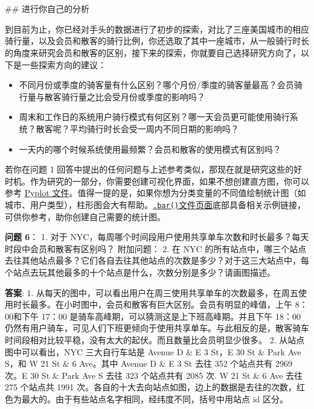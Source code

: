 \documentclass[11pt]{article}
\providecommand{\tightlist}{%
      \setlength{\itemsep}{0pt}\setlength{\parskip}{0pt}}
\begin{document}
    \begin{center}
    \end{center}
    { \hspace*{\fill} \\}
    
    \begin{Verbatim}[commandchars=\\\{\}]


    \end{Verbatim}

     \#\# 进行你自己的分析

到目前为止，你已经对手头的数据进行了初步的探索，对比了三座美国城市的相应骑行量，以及会员和散客的骑行比例，你还选取了其中一座城市，从一般骑行时长的角度来研究会员和散客的区别，接下来的探索，你就要自己选择研究方向了，以下是一些探索方向的建议：

\begin{itemize}
\tightlist
\item
  不同月份或季度的骑客量有什么区别？哪个月份/季度的骑客量最高？会员骑行量与散客骑行量之比会受月份或季度的影响吗？
\item
  周末和工作日的系统用户骑行模式有何区别？哪一天会员更可能使用骑行系统？散客呢？平均骑行时长会受一周内不同日期的影响吗？
\item
  一天内的哪个时候系统使用最频繁？会员和散客的使用模式有区别吗？
\end{itemize}

若你在问题 1
回答中提出的任何问题与上述参考类似，那现在就是研究这些的好时机。作为研究的一部分，你需要创建可视化界面，如果不想创建直方图，你可以参考
\href{https://matplotlib.org/devdocs/api/pyplot_summary.html}{Pyplot
文件}。值得一提的是，如果你想为分类变量的不同值绘制统计图（如城市、用户类型），柱形图会大有帮助。\href{https://matplotlib.org/devdocs/api/_as_gen/matplotlib.pyplot.bar.html\#matplotlib.pyplot.bar}{\texttt{.bar()}文件页面}底部具备相关示例链接，可供你参考，助你创建自己需要的统计图。

\textbf{问题 6}： 1. 对于
NYC，每周哪个时间段用户使用共享单车次数和时长最多？每天时段中会员和散客有区别吗？
附加问题： 2. 在 NYC
的所有站点中，哪三个站点去往其他站点最多？它们各自去往其他站点的次数是多少？对于这三大站点中，每个站点去玩其他最多的十个站点是什么，次数分别是多少？请画图描述。

\textbf{答案}: 1.
从每天的图中，可以看出用户在周三使用共享单车的次数最多，在周五使用时长最多。在小时图中，会员和散客有巨大区别。会员有明显的峰值，上午
8：00和下午 17：00 是骑车高峰期，可以猜测这是上下班高峰期。并且下午
18：00
仍然有用户骑车，可见人们下班更倾向于使用共享单车。与此相反的是，散客骑车时间段相对比较平稳，没有太大的起伏。而且数量比会员明显少很多。
2. 从站点图中可以看出，NYC 三大自行车站是 Avenue D \& E 3 St，E 30 St \&
Park Ave S，和 W 21 St \& 6 Ave。其中 Avenue D \& E 3 St 去往 352
个站点共有 2969 次。E 30 St \& Park Ave S 去往 323 个站点共有 2085 次. W
21 St \& 6 Ave 去往 275 个站点共 1991
次。各自的十大去向站点如图，边上的数据是去往的次数，红色为最大的。由于有些站点名字相同，经纬度不同，括号中用站点
id 区分。
\end{document}
